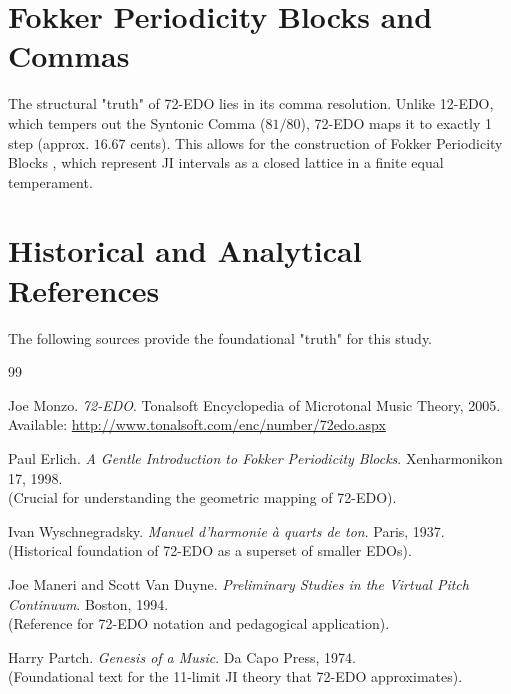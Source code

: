 \documentclass[12pt, a4paper]{article}
\begin{document}
\section{Fokker Periodicity Blocks and Commas}
The structural "truth" of 72-EDO lies in its comma resolution. Unlike 12-EDO, which tempers out the Syntonic Comma ($81/80$), 72-EDO maps it to exactly 1 step (approx. $16.67$ cents). This allows for the construction of Fokker Periodicity Blocks \cite{erlich1998}, which represent JI intervals as a closed lattice in a finite equal temperament.



\section{Historical and Analytical References}
The following sources provide the foundational "truth" for this study.

\begin{thebibliography}{99}

Joe Monzo. \textit{72-EDO}. Tonalsoft Encyclopedia of Microtonal Music Theory, 2005. \\
Available: \url{http://www.tonalsoft.com/enc/number/72edo.aspx}

Paul Erlich. \textit{A Gentle Introduction to Fokker Periodicity Blocks}. Xenharmonikon 17, 1998. \\
(Crucial for understanding the geometric mapping of 72-EDO).

Ivan Wyschnegradsky. \textit{Manuel d'harmonie à quarts de ton}. Paris, 1937. \\
(Historical foundation of 72-EDO as a superset of smaller EDOs).

Joe Maneri and Scott Van Duyne. \textit{Preliminary Studies in the Virtual Pitch Continuum}. Boston, 1994. \\
(Reference for 72-EDO notation and pedagogical application).

Harry Partch. \textit{Genesis of a Music}. Da Capo Press, 1974. \\
(Foundational text for the 11-limit JI theory that 72-EDO approximates).

\end{thebibliography}
\end{document}
